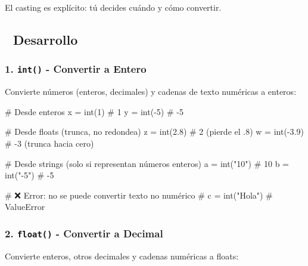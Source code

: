 \documentclass[
  doc,
  floatsintext,
  longtable,
  a4paper,
  nolmodern,
  notxfonts,
  notimes,
  12pt,
  colorlinks=true,linkcolor=blue,citecolor=blue,urlcolor=blue]{apa7}
\newenvironment{Shaded}{\begin{snugshade}}{\end{snugshade}}
\newcommand{\BuiltInTok}[1]{\textcolor[rgb]{0.00,0.23,0.31}{#1}}
\newcommand{\CommentTok}[1]{\textcolor[rgb]{0.37,0.37,0.37}{#1}}
\newcommand{\DecValTok}[1]{\textcolor[rgb]{0.68,0.00,0.00}{#1}}
\newcommand{\FloatTok}[1]{\textcolor[rgb]{0.68,0.00,0.00}{#1}}
\newcommand{\NormalTok}[1]{\textcolor[rgb]{0.00,0.23,0.31}{#1}}
\newcommand{\OperatorTok}[1]{\textcolor[rgb]{0.37,0.37,0.37}{#1}}
\newcommand{\StringTok}[1]{\textcolor[rgb]{0.13,0.47,0.30}{#1}}
\begin{document}
El casting es explícito: tú decides cuándo y cómo convertir.

\subsection{📐 Desarrollo}\label{desarrollo}

\subsubsection{\texorpdfstring{1. \texttt{int()} - Convertir a
Entero}{1. int() - Convertir a Entero}}\label{int---convertir-a-entero}

Convierte números (enteros, decimales) y cadenas de texto numéricas a
enteros:

\begin{Shaded}
\begin{Highlighting}[]
\CommentTok{\# Desde enteros}
\NormalTok{x }\OperatorTok{=} \BuiltInTok{int}\NormalTok{(}\DecValTok{1}\NormalTok{)      }\CommentTok{\# 1}
\NormalTok{y }\OperatorTok{=} \BuiltInTok{int}\NormalTok{(}\OperatorTok{{-}}\DecValTok{5}\NormalTok{)     }\CommentTok{\# {-}5}

\CommentTok{\# Desde floats (trunca, no redondea)}
\NormalTok{z }\OperatorTok{=} \BuiltInTok{int}\NormalTok{(}\FloatTok{2.8}\NormalTok{)    }\CommentTok{\# 2 (pierde el .8)}
\NormalTok{w }\OperatorTok{=} \BuiltInTok{int}\NormalTok{(}\OperatorTok{{-}}\FloatTok{3.9}\NormalTok{)   }\CommentTok{\# {-}3 (trunca hacia cero)}

\CommentTok{\# Desde strings (solo si representan números enteros)}
\NormalTok{a }\OperatorTok{=} \BuiltInTok{int}\NormalTok{(}\StringTok{"10"}\NormalTok{)   }\CommentTok{\# 10}
\NormalTok{b }\OperatorTok{=} \BuiltInTok{int}\NormalTok{(}\StringTok{"{-}5"}\NormalTok{)   }\CommentTok{\# {-}5}

\CommentTok{\# ❌ Error: no se puede convertir texto no numérico}
\CommentTok{\# c = int("Hola")  \# ValueError}
\end{Highlighting}
\end{Shaded}

\subsubsection{\texorpdfstring{2. \texttt{float()} - Convertir a
Decimal}{2. float() - Convertir a Decimal}}\label{float---convertir-a-decimal}

Convierte enteros, otros decimales y cadenas numéricas a floats:
\end{document}

